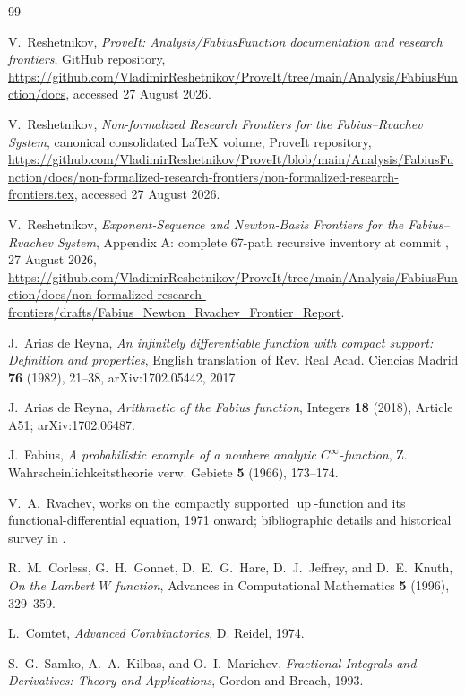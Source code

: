 \documentclass[11pt,oneside]{article}
\theoremstyle{definition}
\newcommand{\upf}{\operatorname{up}}
\begin{document}
\begin{thebibliography}{99}

V.~Reshetnikov,
\emph{ProveIt: Analysis/FabiusFunction documentation and research frontiers},
GitHub repository,
\url{https://github.com/VladimirReshetnikov/ProveIt/tree/main/Analysis/FabiusFunction/docs},
accessed 27 August 2026.

V.~Reshetnikov,
\emph{Non-formalized Research Frontiers for the Fabius--Rvachev System},
canonical consolidated LaTeX volume, ProveIt repository,
\url{https://github.com/VladimirReshetnikov/ProveIt/blob/main/Analysis/FabiusFunction/docs/non-formalized-research-frontiers/non-formalized-research-frontiers.tex},
accessed 27 August 2026.

V.~Reshetnikov,
\emph{Exponent-Sequence and Newton-Basis Frontiers for the Fabius--Rvachev System},
Appendix A: complete 67-path recursive inventory at commit
, 27 August 2026,
\url{https://github.com/VladimirReshetnikov/ProveIt/tree/main/Analysis/FabiusFunction/docs/non-formalized-research-frontiers/drafts/Fabius_Newton_Rvachev_Frontier_Report}.

J.~Arias de Reyna,
\emph{An infinitely differentiable function with compact support: Definition and
properties},
English translation of Rev. Real Acad. Ciencias Madrid \textbf{76} (1982), 21--38,
arXiv:1702.05442, 2017.

J.~Arias de Reyna,
\emph{Arithmetic of the Fabius function},
Integers \textbf{18} (2018), Article A51; arXiv:1702.06487.

J.~Fabius,
\emph{A probabilistic example of a nowhere analytic \(C^\infty\)-function},
Z. Wahrscheinlichkeitstheorie verw. Gebiete \textbf{5} (1966), 173--174.

V.~A.~Rvachev,
works on the compactly supported \(\upf\)-function and its functional-differential
equation, 1971 onward; bibliographic details and historical survey in
\cite{Arias1982,AriasArithmetic}.

R.~M.~Corless, G.~H.~Gonnet, D.~E.~G.~Hare, D.~J.~Jeffrey, and D.~E.~Knuth,
\emph{On the Lambert \(W\) function},
Advances in Computational Mathematics \textbf{5} (1996), 329--359.

L.~Comtet,
\emph{Advanced Combinatorics},
D. Reidel, 1974.

S.~G.~Samko, A.~A.~Kilbas, and O.~I.~Marichev,
\emph{Fractional Integrals and Derivatives: Theory and Applications},
Gordon and Breach, 1993.


\end{thebibliography}
\end{document}
